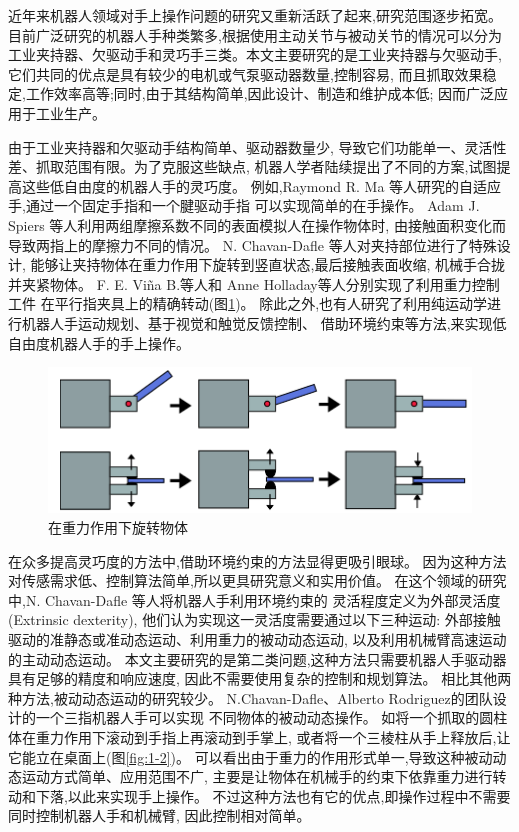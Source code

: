 近年来机器人领域对手上操作问题的研究又重新活跃了起来,研究范围逐步拓宽。
目前广泛研究的机器人手种类繁多,根据使用主动关节与被动关节的情况可以分为
工业夹持器、欠驱动手和灵巧手三类。本文主要研究的是工业夹持器与欠驱动手,
它们共同的优点是具有较少的电机或气泵驱动器数量,控制容易,
而且抓取效果稳定,工作效率高等;同时,由于其结构简单,因此设计、制造和维护成本低;
因而广泛应用于工业生产。

由于工业夹持器和欠驱动手结构简单、驱动器数量少,
导致它们功能单一、灵活性差、抓取范围有限。为了克服这些缺点,
机器人学者陆续提出了不同的方案,试图提高这些低自由度的机器人手的灵巧度。
例如,Raymond R. Ma 等人研究的自适应手,通过一个固定手指和一个腱驱动手指
可以实现简单的在手操作\cite{ref2}。
Adam J. Spiers 等人利用两组摩擦系数不同的表面模拟人在操作物体时,
由接触面积变化而导致两指上的摩擦力不同的情况\cite{ref3}。
N. Chavan-Dafle 等人对夹持部位进行了特殊设计,
能够让夹持物体在重力作用下旋转到竖直状态,最后接触表面收缩,
机械手合拢并夹紧物体\cite{ref4}。
F. E. Viña B.等人和 Anne Holladay等人分别实现了利用重力控制工件
在平行指夹具上的精确转动\cite{ref5,ref6}(图\ref{fig:1-1})。
除此之外,也有人研究了利用纯运动学进行机器人手运动规划、基于视觉和触觉反馈控制、
借助环境约束等方法,来实现低自由度机器人手的手上操作\cite{ref1}。

\begin{figure}[!ht]
  \centering
  \includegraphics[scale=1.2]{chapter01/pics/1-1}
  \caption{在重力作用下旋转物体}
  \label{fig:1-1}
  \vspace{-0.3cm}
\end{figure}

在众多提高灵巧度的方法中,借助环境约束的方法显得更吸引眼球。
因为这种方法对传感需求低、控制算法简单,所以更具研究意义和实用价值。
在这个领域的研究中,N. Chavan-Dafle 等人将机器人手利用环境约束的
灵活程度定义为外部灵活度(Extrinsic dexterity),
他们认为实现这一灵活度需要通过以下三种运动:
外部接触驱动的准静态或准动态运动、利用重力的被动动态运动,
以及利用机械臂高速运动的主动动态运动\cite{ref7}。
本文主要研究的是第二类问题,这种方法只需要机器人手驱动器具有足够的精度和响应速度,
因此不需要使用复杂的控制和规划算法。
相比其他两种方法,被动动态运动的研究较少。
N.Chavan-Dafle、Alberto Rodriguez的团队设计的一个三指机器人手可以实现
不同物体的被动动态操作。
如将一个抓取的圆柱体在重力作用下滚动到手指上再滚动到手掌上,
或者将一个三棱柱从手上释放后,让它能立在桌面上\cite{ref7}(图\ref{fig:1-2})。
可以看出由于重力的作用形式单一,导致这种被动动态运动方式简单、应用范围不广,
主要是让物体在机械手的约束下依靠重力进行转动和下落,以此来实现手上操作。
不过这种方法也有它的优点,即操作过程中不需要同时控制机器人手和机械臂,
因此控制相对简单。

